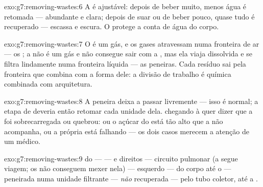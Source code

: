 \begin{solution}{exo:g7:removing-wastes:6}
A  é ajustável: depois de beber muito, menos água é
retomada ---  abundante e clara; depois de suar ou de beber pouco,
quase tudo é recuperado ---  escassa e escura. O  protege a
conta de água do corpo.
\end{solution}

\begin{solution}{exo:g7:removing-wastes:7}
O  é um gás, e os gases atravessam numa fronteira de ar
--- os ; a  não é um gás e não consegue sair com a
, mas ela viaja dissolvida e se filtra lindamente numa
fronteira líquida --- as peneiras. Cada resíduo sai pela fronteira que
combina com a forma dele: a divisão de trabalho é química combinada
com arquitetura.
\end{solution}

\begin{solution}{exo:g7:removing-wastes:8}
A peneira deixa a  passar livremente --- isso é normal; a etapa
de  deveria então retomar cada unidade dela. 
chegando à  quer dizer que a  foi sobrecarregada ou
quebrou: ou o açúcar do  está tão alto que a  não
acompanha, ou a própria  está falhando --- os dois casos
merecem a atenção de um médico.
\end{solution}

\begin{solution}{exo:g7:removing-wastes:9}
 do  ---  ---  e  direitos ---
circuito pulmonar (a  segue viagem; os  não conseguem
mexer nela) ---  esquerdo ---  do corpo até o  ---
peneirada numa unidade filtrante --- \emph{não} recuperada --- pelo tubo
coletor, até a .
\end{solution}

